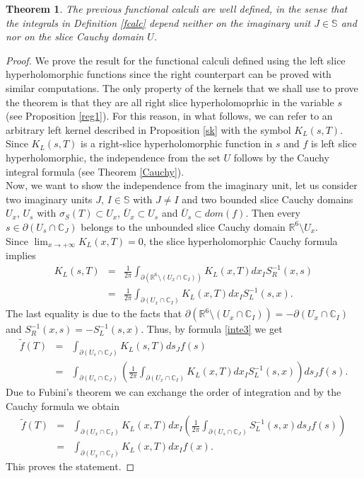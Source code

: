 \documentclass[reqno,11pt]{amsart}
\numberwithin{equation}{section}
\newtheorem{theorem}{Theorem}[section]
\theoremstyle{definition}
\begin{document}
\begin{theorem}
	The previous functional calculi are well defined, in the sense that the integrals in Definition \ref{fcalc} depend neither on the imaginary unit $J \in \mathbb{S}$ and nor on the slice Cauchy domain $U$.
\end{theorem}
\begin{proof}
	We prove the result for the functional calculi defined using the left slice hyperholomorphic functions since the right counterpart can be proved with similar computations. The only property of the kernels that we shall use to prove the theorem is that they are all right slice hyperholomoprhic in the variable $s$ (see Proposition \ref{reg1}). For this reason, in what follows, we can refer to an arbitrary left kernel described in Proposition \ref{sk} with the symbol $K_L(s,T)$.
	\\ Since $ K_L(s,T)$ is a right-slice hyperholomorphic function in $s$ and $f$ is left slice hyperholomorphic, the independence from the set $U$ follows by the Cauchy integral formula (see Theorem \ref{Cauchy}).
	\\ Now, we want to show the independence from the imaginary unit, let us consider two imaginary units $J$, $I \in \mathbb{S}$ with $J \neq I$ and two bounded slice Cauchy domains $U_x$, $U_s$ with $ \sigma_{S}(T) \subset U_x$, $\overline{U}_x \subset U_s$ and $\overline{U}_s \subset dom(f)$. Then every $s \in \partial (U_s \cap \mathbb{C}_J)$ belongs to the unbounded slice Cauchy domain $\mathbb{R}^6\setminus  U_x $.
	\\ Since $ \lim_{x \to + \infty} K_{L}(x,T)=0$, the slice hyperholomorphic Cauchy formula implies
	\begin{eqnarray}
		\nonumber
		K_L(s,T)&=& \frac{1}{2 \pi} \int_{\partial (\mathbb{R}^6 \setminus (U_x \cap \mathbb{C}_I))} K_L(x,T) dx_I S^{-1}_R(x,s)\\
		\label{inte3}
		&=& \frac{1}{2 \pi} \int_{\partial (U_x \cap \mathbb{C}_I)} K_L(x,T) dx_I S^{-1}_L(s,x).
	\end{eqnarray}
	The last equality is due to the facts that $ \partial (\mathbb{R}^6 \setminus (U_x \cap \mathbb{C}_I))=-\partial (U_x \cap \mathbb{C}_I)$ and $S^{-1}_R(x,s)=-S^{-1}_L(s,x).$ Thus, by formula \eqref{inte3} we get
	\begin{eqnarray*}
		\tilde{f}(T)&=& \int_{\partial(U_s \cap \mathbb{C}_J)} K_L(s,T) ds_J f(s)\\
		&=& \int_{\partial(U_s \cap \mathbb{C}_J)} \left( \frac{1}{2 \pi} \int_{\partial(U_x \cap \mathbb{C}_I)}  K_L(x,T) dx_I S_{L}^{-1}(s,x)\right) ds_J f(s).
	\end{eqnarray*}
	Due to Fubini's theorem we can exchange the order of integration and by the Cauchy formula we obtain
	\begin{eqnarray*}
		\tilde{f}(T)&=&  \int_{\partial (U_x \cap \mathbb{C}_I)} K_L(x,T)dx_I  \left( \frac{1}{2 \pi} \int_{\partial (U_s \cap \mathbb{C}_J)}   S_{L}^{-1}(s,x) ds_J f(s) \right)\\
		&=&  \int_{\partial(U_x \cap \mathbb{C}_I)} K_L(x,T) dx_I f(x).
	\end{eqnarray*}
	This proves the statement.
\end{proof}
\end{document}
